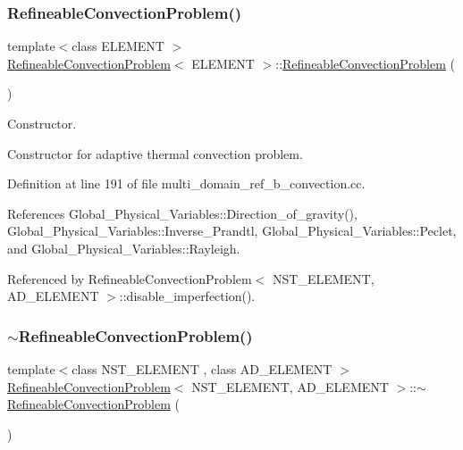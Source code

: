 \subsubsection{\texorpdfstring{Refineable\+Convection\+Problem()}{RefineableConvectionProblem()}\hspace{0.1cm}{\footnotesize\ttfamily [1/2]}}
{\footnotesize\ttfamily template$<$class E\+L\+E\+M\+E\+NT $>$ \\
\hyperlink{classRefineableConvectionProblem}{Refineable\+Convection\+Problem}$<$ E\+L\+E\+M\+E\+NT $>$\+::\hyperlink{classRefineableConvectionProblem}{Refineable\+Convection\+Problem} (\begin{DoxyParamCaption}{ }\end{DoxyParamCaption})}



Constructor. 

Constructor for adaptive thermal convection problem. 

Definition at line 191 of file multi\+\_\+domain\+\_\+ref\+\_\+b\+\_\+convection.\+cc.



References Global\+\_\+\+Physical\+\_\+\+Variables\+::\+Direction\+\_\+of\+\_\+gravity(), Global\+\_\+\+Physical\+\_\+\+Variables\+::\+Inverse\+\_\+\+Prandtl, Global\+\_\+\+Physical\+\_\+\+Variables\+::\+Peclet, and Global\+\_\+\+Physical\+\_\+\+Variables\+::\+Rayleigh.



Referenced by Refineable\+Convection\+Problem$<$ N\+S\+T\+\_\+\+E\+L\+E\+M\+E\+N\+T, A\+D\+\_\+\+E\+L\+E\+M\+E\+N\+T $>$\+::disable\+\_\+imperfection().

\mbox{\label{classRefineableConvectionProblem_a43fc2693230601928578d5b0c6380943}} 
\subsubsection{\texorpdfstring{$\sim$\+Refineable\+Convection\+Problem()}{~RefineableConvectionProblem()}\hspace{0.1cm}{\footnotesize\ttfamily [1/2]}}
{\footnotesize\ttfamily template$<$class N\+S\+T\+\_\+\+E\+L\+E\+M\+E\+NT , class A\+D\+\_\+\+E\+L\+E\+M\+E\+NT $>$ \\
\hyperlink{classRefineableConvectionProblem}{Refineable\+Convection\+Problem}$<$ N\+S\+T\+\_\+\+E\+L\+E\+M\+E\+NT, A\+D\+\_\+\+E\+L\+E\+M\+E\+NT $>$\+::$\sim$\hyperlink{classRefineableConvectionProblem}{Refineable\+Convection\+Problem} (\begin{DoxyParamCaption}{ }\end{DoxyParamCaption})\hspace{0.3cm}{\ttfamily [inline]}}



